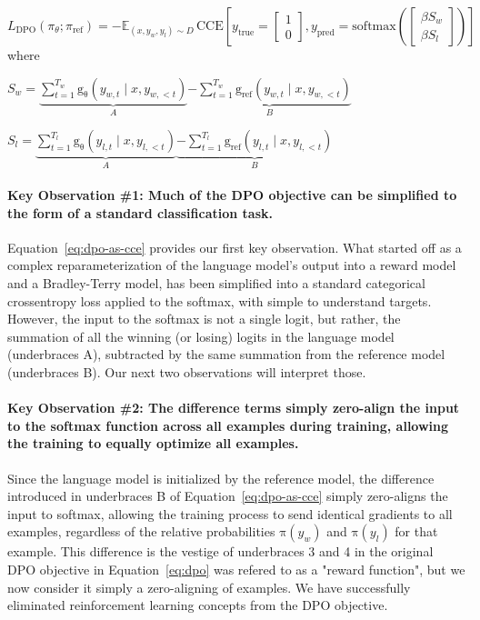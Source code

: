 \documentclass[twoside,11pt]{article}
\begin{document}
\begin{equation}
\label{eq:dpo-as-cce}
L_\mathrm{DPO}(\pi_\theta; \pi_\mathrm{ref}) = 
-\mathbb{E}_{(x, y_w, y_l) \sim D} \, 
\text{CCE}
\left[
  y_\mathrm{true} = 
    \begin{bmatrix}
    1 \\ 
    0
    \end{bmatrix}
  ,
  y_\mathrm{pred} = 
    \text{softmax}
    \left(
    \begin{bmatrix}
    \beta S_w \\ 
    \beta S_l
    \end{bmatrix}
  \right)
\right]
\end{equation}
where
\begin{description}
\item
$ S_w = 
  \underbrace{
    \sum_{t=1}^{T_w} \mathrm{g_\theta}(y_{w,t} \mid x, y_{w,<t}) 
    }_{A}
    \underbrace{
  - 
  \sum_{t=1}^{T_w}\mathrm{g_\mathrm{ref}}(y_{w,t} \mid x, y_{w,<t})
  }_{B}
$
\item
$
S_l = 
  \underbrace{
    \sum_{t=1}^{T_l} \mathrm{g_\theta}(y_{l,t} \mid x, y_{l,<t}) 
  }_{A}
  \underbrace{
  - 
  \sum_{t=1}^{T_l} \mathrm{g_\mathrm{ref}}(y_{l,t} \mid x, y_{l,<t})
  }_{B}
$
\end{description}

\paragraph{Key Observation \#1: Much of the DPO objective 
can be simplified to the form of a 
standard classification task.} \label{obs:dpo-as-cce}
Equation~\ref{eq:dpo-as-cce} 
provides our first key observation. 
What started off as a complex reparameterization 
of the language model's output into a reward
model and a Bradley-Terry model, 
has been simplified into a standard 
categorical crossentropy loss applied to the softmax, with
simple to understand targets. However, the
input to the softmax is not a single logit, but rather, the 
summation of all the winning (or losing) logits in the language model
(underbraces A), 
subtracted by the same summation from the reference model (underbraces B).
Our next two observations will interpret those. 

\paragraph{Key Observation \#2: The difference terms simply zero-align
the input to the softmax function across all examples during training,
allowing the training to equally optimize all examples.} 
Since
the language model is initialized by the reference model,
the difference introduced in underbraces B of Equation~\ref{eq:dpo-as-cce}
simply zero-aligns
the input to softmax, allowing the training process to send identical
gradients to all examples, regardless of the relative probabilities
$\mathrm{\pi}(y_w)$ and $\mathrm{\pi}(y_l)$ for that example. 
This difference is the
vestige of underbraces 3 and 4 in the original DPO objective in 
Equation~\ref{eq:dpo}
was refered to as a "reward function", 
but we now consider it simply a zero-aligning of examples. We have
successfully eliminated reinforcement learning concepts from the DPO objective. 
\end{document}
